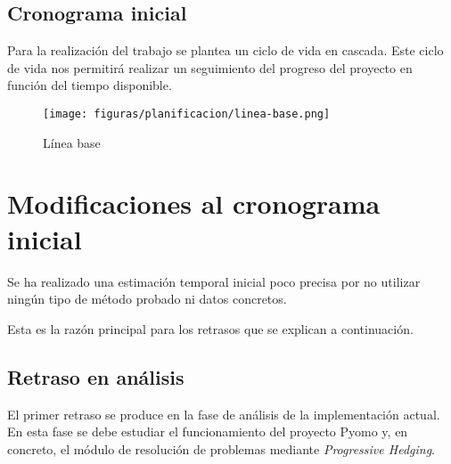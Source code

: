 

\subsection{Cronograma inicial}

Para la realización del trabajo se plantea un ciclo de vida en cascada. Este ciclo de vida nos permitirá realizar un seguimiento del progreso del proyecto en función del tiempo disponible.

\begin{figure}[H]
    \centerline{\texttt{[image: figuras/planificacion/linea-base.png]}}
    \caption{Línea base}
\end{figure}

\section{Modificaciones al cronograma inicial}
\label{sec:modificacionesCronograma}

Se ha realizado una estimación temporal inicial poco precisa por no utilizar ningún tipo de método probado ni datos concretos.

Esta es la razón principal para los retrasos que se explican a continuación.

\subsection{Retraso en análisis}

El primer retraso se produce en la fase de análisis de la implementación actual. En esta fase se debe estudiar el funcionamiento del proyecto Pyomo y, en concreto, el módulo de resolución de problemas mediante \textit{Progressive Hedging}. 

